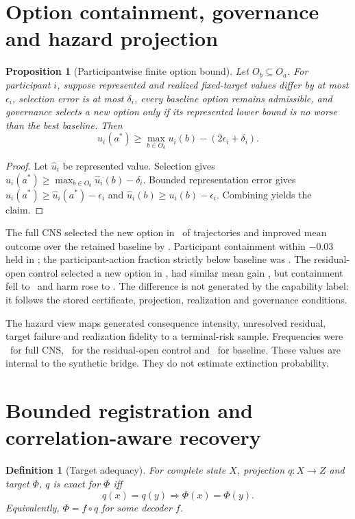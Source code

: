 \documentclass[10pt]{article}
\newtheorem{definition}{Definition}
\newtheorem{proposition}{Proposition}
\begin{document}
\section{Option containment, governance and hazard projection}
\begin{proposition}[Participantwise finite option bound]
Let $O_b\subseteq O_a$. For participant $i$, suppose represented and realized fixed-target values differ by at most $\epsilon_i$, selection error is at most $\delta_i$, every baseline option remains admissible, and governance selects a new option only if its represented lower bound is no worse than the best baseline. Then
\begin{equation}
u_i(a^*)\geq\max_{b\in O_b}u_i(b)-(2\epsilon_i+\delta_i).
\end{equation}
\end{proposition}
\begin{proof}
Let $\widehat u_i$ be represented value. Selection gives $\widehat u_i(a^*)\geq\max_{b\in O_b}\widehat u_i(b)-\delta_i$. Bounded representation error gives $u_i(a^*)\geq\widehat u_i(a^*)-\epsilon_i$ and $\widehat u_i(b)\geq u_i(b)-\epsilon_i$. Combining yields the claim.
\end{proof}

The full CNS selected the new option in \FullSelect\ of trajectories and improved mean outcome over the retained baseline by \FullOptionGain. Participant containment within $-0.03$ held in \FullContain; the participant-action fraction strictly below baseline was \FullHarm. The residual-open control selected a new option in \IncSelect, had similar mean gain \IncOptionGain, but containment fell to \IncContain\ and harm rose to \IncHarm. The difference is not generated by the capability label: it follows the stored certificate, projection, realization and governance conditions.

The hazard view maps generated consequence intensity, unresolved residual, target failure and realization fidelity to a terminal-risk sample. Frequencies were \FullRisk\ for full CNS, \IncRisk\ for the residual-open control and \BaseRisk\ for baseline. These values are internal to the synthetic bridge. They do not estimate extinction probability.

\section{Bounded registration and correlation-aware recovery}
\begin{definition}[Target adequacy]
For complete state $X$, projection $q:X\rightarrow Z$ and target $\Phi$, $q$ is exact for $\Phi$ iff
\begin{equation}
q(x)=q(y)\Longrightarrow\Phi(x)=\Phi(y).
\end{equation}
Equivalently, $\Phi=f\circ q$ for some decoder $f$.
\end{definition}
\end{document}
